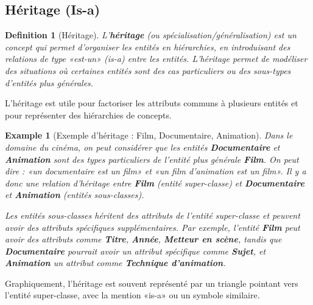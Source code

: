 \documentclass{article}
\newtheorem{definition}{Definition}
\newtheorem{example}{Example}
\begin{document}
\subsection{Héritage (Is-a)}

\begin{definition}[Héritage]
    L'\textbf{héritage} (ou spécialisation/généralisation) est un concept qui permet d'organiser les entités en hiérarchies, en introduisant des relations de type «est-un» (is-a) entre les entités.  L'héritage permet de modéliser des situations où certaines entités sont des cas particuliers ou des sous-types d'entités plus générales.
\end{definition}

L'héritage est utile pour factoriser les attributs communs à plusieurs entités et pour représenter des hiérarchies de concepts.

\begin{example}[Exemple d'héritage : Film, Documentaire, Animation]
    Dans le domaine du cinéma, on peut considérer que les entités \textbf{Documentaire} et \textbf{Animation} sont des types particuliers de l'entité plus générale \textbf{Film}.  On peut dire : «un documentaire est un film» et «un film d'animation est un film».  Il y a donc une relation d'héritage entre \textbf{Film} (entité super-classe) et \textbf{Documentaire} et \textbf{Animation} (entités sous-classes).

    Les entités sous-classes héritent des attributs de l'entité super-classe et peuvent avoir des attributs spécifiques supplémentaires.  Par exemple, l'entité \textbf{Film} peut avoir des attributs comme \textbf{Titre}, \textbf{Année}, \textbf{Metteur en scène}, tandis que \textbf{Documentaire} pourrait avoir un attribut spécifique comme \textbf{Sujet}, et \textbf{Animation} un attribut comme \textbf{Technique d'animation}.
\end{example}

Graphiquement, l'héritage est souvent représenté par un triangle pointant vers l'entité super-classe, avec la mention «is-a» ou un symbole similaire.
\end{document}
